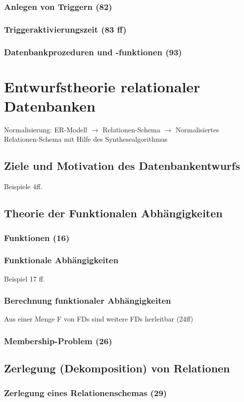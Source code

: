 \subsubsection{Anlegen von Triggern (82)}
\subsubsection{Triggeraktivierungszeit (83 ff)}
\subsubsection{Datenbankprozeduren und -funktionen (93)}

\section{Entwurfstheorie relationaler Datenbanken}
Normalisierung: ER-Modell $\to$ Relationen-Schema $\to$ Normalisiertes Relationen-Schema mit Hilfe des Synthesealgorithmus
\subsection{Ziele und Motivation des Datenbankentwurfs}
Beispiele 4ff.
\subsection{Theorie der Funktionalen Abhängigkeiten}
\subsubsection{Funktionen (16)}
\subsubsection{Funktionale Abhängigkeiten}
Beispiel 17 ff.
\subsubsection{Berechnung funktionaler Abhängigkeiten}
Aus einer Menge F von FDs sind weitere FDs herleitbar (24ff)
\subsubsection{Membership-Problem (26)}
\subsection{Zerlegung (Dekomposition) von Relationen}
\subsubsection{Zerlegung eines Relationenschemas (29)}
